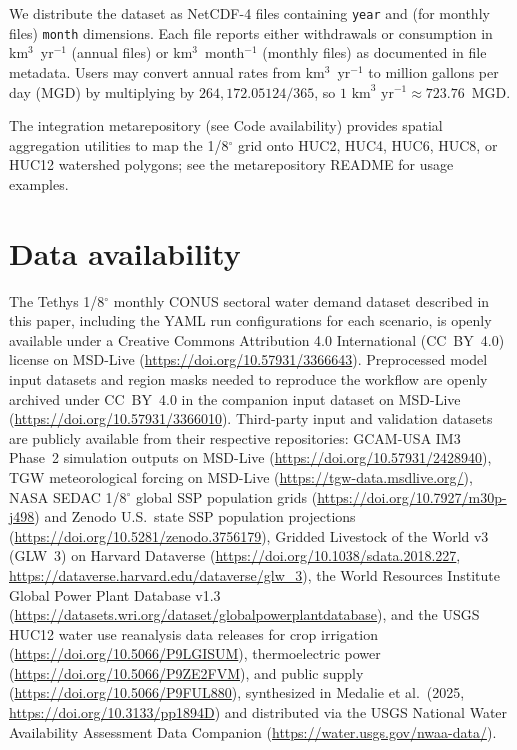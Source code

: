 \documentclass[fleqn,10pt]{wlscirep}
\begin{document}
We distribute the dataset as NetCDF-4 files containing \texttt{year} and (for monthly files) \texttt{month} dimensions. Each file reports either withdrawals or consumption in km$^3$~yr$^{-1}$ (annual files) or km$^3$~month$^{-1}$ (monthly files) as documented in file metadata. Users may convert annual rates from km$^3$~yr$^{-1}$ to million gallons per day (MGD) by multiplying by $264{,}172.05124/365$, so $1\text{ km}^3\text{ yr}^{-1} \approx 723.76$~MGD.

The integration metarepository\cite{cambrackenIMMMSFATethys_integration_metarepoV1012026} (see Code availability) provides spatial aggregation utilities to map the 1/8$^{\circ}$ grid onto HUC2, HUC4, HUC6, HUC8, or HUC12 watershed polygons; see the metarepository README for usage examples.

\section*{Data availability}

The Tethys 1/8$^{\circ}$ monthly CONUS sectoral water demand dataset described in this paper, including the YAML run configurations for each scenario, is openly available under a Creative Commons Attribution 4.0 International (CC~BY~4.0) license on MSD-Live (\url{https://doi.org/10.57931/3366643}). Preprocessed model input datasets and region masks needed to reproduce the workflow are openly archived under CC~BY~4.0 in the companion input dataset on MSD-Live (\url{https://doi.org/10.57931/3366010}). Third-party input and validation datasets are publicly available from their respective repositories: GCAM-USA IM3 Phase~2 simulation outputs on MSD-Live (\url{https://doi.org/10.57931/2428940}), TGW meteorological forcing on MSD-Live (\url{https://tgw-data.msdlive.org/}), NASA SEDAC 1/8$^{\circ}$ global SSP population grids (\url{https://doi.org/10.7927/m30p-j498}) and Zenodo U.S.\ state SSP population projections (\url{https://doi.org/10.5281/zenodo.3756179}), Gridded Livestock of the World v3 (GLW~3) on Harvard Dataverse (\url{https://doi.org/10.1038/sdata.2018.227}, \url{https://dataverse.harvard.edu/dataverse/glw_3}), the World Resources Institute Global Power Plant Database v1.3 (\url{https://datasets.wri.org/dataset/globalpowerplantdatabase}), and the USGS HUC12 water use reanalysis data releases for crop irrigation (\url{https://doi.org/10.5066/P9LGISUM}), thermoelectric power (\url{https://doi.org/10.5066/P9ZE2FVM}), and public supply (\url{https://doi.org/10.5066/P9FUL880}), synthesized in Medalie et al.\ (2025, \url{https://doi.org/10.3133/pp1894D}) and distributed via the USGS National Water Availability Assessment Data Companion (\url{https://water.usgs.gov/nwaa-data/}).
\end{document}
